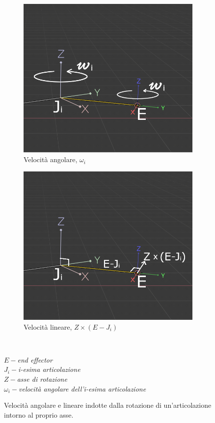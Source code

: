 \begin{figure}[H]
\centering
\begin{subfigure}{.5\textwidth}
  \centering
  \includegraphics[width=.9\linewidth]{Figures/16a}
  \caption{Velocità angolare, $\omega_i$}
  \label{fig:angolarA}
\end{subfigure}%
\begin{subfigure}{.5\textwidth}
  \centering
  \includegraphics[width=.9\linewidth]{Figures/16b}
  \caption{Velocità lineare, $Z\times(E-J_i)$}
  \label{fig:linearB}
\end{subfigure}\\[2ex]
  \begin{minipage}{.8\textwidth}
  \footnotesize
  \emph{$E-$end effector\\$J_i-$i-esima articolazione\\$Z-$asse di rotazione\\$\omega_i-$velocità angolare dell'i-esima articolazione}
  \end{minipage}
\decoRule
\caption[Velocità di un'articolazione]{Velocità angolare e lineare indotte dalla rotazione di un'articolazione intorno al proprio asse.}
\label{fig:velocities}
\end{figure}

